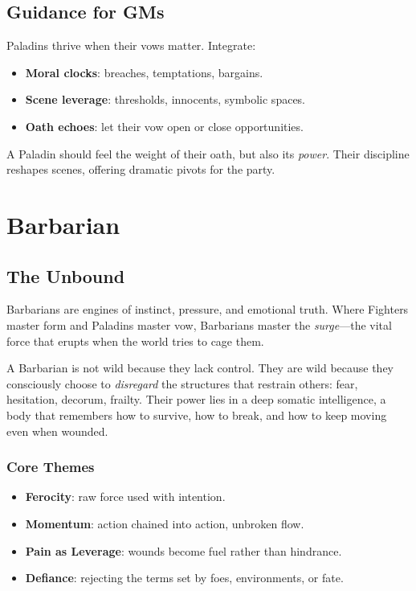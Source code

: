 \documentclass[11pt]{book}
\begin{document}
\section{Guidance for GMs}
Paladins thrive when their vows matter. Integrate:
\begin{itemize}
  \item \textbf{Moral clocks}: breaches, temptations, bargains.  
  \item \textbf{Scene leverage}: thresholds, innocents, symbolic spaces.  
  \item \textbf{Oath echoes}: let their vow open or close opportunities.  
\end{itemize}

A Paladin should feel the weight of their oath, but also its \emph{power}.
Their discipline reshapes scenes, offering dramatic pivots for the party.

\bigskip

\chapter{Barbarian}
\label{chap:barbarian}

\section{The Unbound}
Barbarians are engines of instinct, pressure, and emotional truth.  
Where Fighters master form and Paladins master vow, Barbarians master the \emph{surge}---the
vital force that erupts when the world tries to cage them.

A Barbarian is not wild because they lack control.  
They are wild because they consciously choose to \emph{disregard} the structures that restrain
others: fear, hesitation, decorum, frailty. Their power lies in a deep somatic intelligence,
a body that remembers how to survive, how to break, and how to keep moving even when wounded.

\subsection{Core Themes}
\begin{itemize}
  \item \textbf{Ferocity}: raw force used with intention.
  \item \textbf{Momentum}: action chained into action, unbroken flow.
  \item \textbf{Pain as Leverage}: wounds become fuel rather than hindrance.
  \item \textbf{Defiance}: rejecting the terms set by foes, environments, or fate.
\end{itemize}
\end{document}
